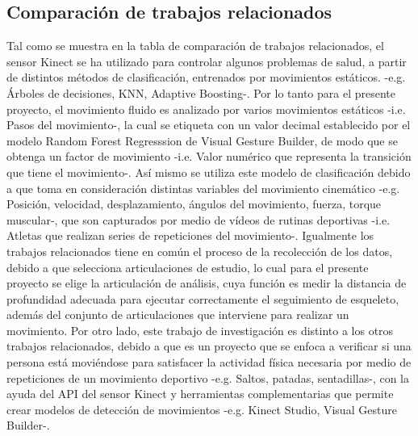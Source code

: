 \subsection{Comparaci\'on de trabajos relacionados} \label{tr:10}
Tal como se muestra en la tabla de comparaci\'on de trabajos relacionados, el sensor Kinect se ha utilizado para controlar algunos problemas de salud, a partir de distintos m\'etodos de clasificaci\'on, entrenados por  movimientos est\'aticos. -e.g. \'Arboles de decisiones, KNN, Adaptive Boosting-. Por lo tanto para el presente proyecto, el movimiento fluido es analizado por varios movimientos est\'aticos -i.e. Pasos del movimiento-, la cual se etiqueta con un valor decimal establecido por el modelo Random Forest Regresssion de Visual Gesture Builder, de modo que se obtenga un factor de movimiento -i.e. Valor num\'erico que representa la transici\'on que tiene el movimiento-. As\'i mismo se utiliza este modelo de clasificaci\'on debido a que toma en consideraci\'on distintas variables del movimiento cinem\'atico -e.g. Posici\'on, velocidad, desplazamiento, \'angulos del movimiento, fuerza, torque muscular-, que son capturados por medio de v\'ideos de rutinas deportivas -i.e. Atletas que realizan series de repeticiones del movimiento-.
\medbreak
Igualmente los trabajos relacionados tiene en com\'un el proceso de la recolecci\'on de los datos, debido a que selecciona articulaciones de estudio, lo cual para el presente proyecto se elige la articulaci\'on de an\'alisis, cuya funci\'on es medir la distancia de profundidad adecuada para ejecutar correctamente el seguimiento de esqueleto, adem\'as del conjunto de articulaciones que interviene para realizar un movimiento.
\medbreak
Por otro lado, este trabajo de investigaci\'on es distinto a los otros trabajos relacionados, debido a que es un proyecto que se enfoca a verificar si una persona est\'a movi\'endose para satisfacer la actividad f\'isica necesaria por medio de repeticiones de un movimiento deportivo -e.g. Saltos, patadas, sentadillas-, con la ayuda del API del sensor Kinect y herramientas complementarias que permite crear modelos de detecci\'on de movimientos -e.g. Kinect Studio, Visual Gesture Builder-.
